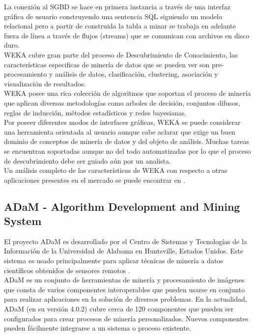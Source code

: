 La conexi\'on al SGBD se hace en primera instancia a trav\'es de una interfaz gr\'afica de usuario construyendo
una sentencia SQL siguiendo un modelo relacional pero a partir de construida la tabla a minar se trabaja en
adelante fuera de l\'inea a trav\'es de flujos (streams) que se comunican con archivos en disco duro.\\

WEKA cubre gran parte del proceso de Descubrimiento de Conocimiento, las caracter\'isticas especificas de
miner\'ia de datos que se pueden ver son pre-procesamiento y an\'alisis de datos, clasificaci\'on, clustering,
asociaci\'on y visualizaci\'on de resultados.\\

WEKA posee una rica colecci\'on de algoritmos que soportan el proceso de miner\'ia que aplican diversas
metodolog\'ias como arboles de decisi\'on, conjuntos difusos, reglas de inducci\'on, m\'etodos estad\'isticos y
redes bayesianas.\\

Por poseer diferentes modos de interfaces gr\'aficas, WEKA se puede considerar una herramienta orientada al
usuario aunque cabe aclarar que exige un buen dominio de conceptos de miner\'ia de datos y del objeto de
an\'alisis.  Muchas tareas se encuentran soportadas aunque no del todo automatizadas por lo que el proceso de
descubrimiento debe ser guiado a\'un por un analista.\\

Un an\'alisis completo de las caracter\'isticas de WEKA con respecto a otras aplicaciones presentes en el mercado
se puede encontrar en \cite{10}.

\subsection{ADaM - Algorithm Development and Mining System}
El proyecto ADaM es desarrollado por el Centro de Sistemas y Tecnolog\'ias de la Informaci\'on de la Universidad
de Alabama en Huntsville, Estados Unidos.  Este sistema es usado principalmente para aplicar t\'ecnicas de
miner\'ia a datos cient\'ificos obtenidos de sensores remotos \cite{adam}.\\

ADaM es un conjunto de herramientas de miner\'ia y procesamiento de im\'agenes que consta de varios componentes
interoperables que pueden u\-sarse en conjunto para realizar aplicaciones en la soluci\'on de diversos
pro\-blemas. En la actualidad, ADaM (en su versi\'on 4.0.2) cubre cerca de 120 componentes \cite{adamComp} que
pueden ser configurados para crear procesos de mine\-r\'ia personalizados.  Nuevos componentes pueden f\'acilmente
integrarse a un sistema o proceso existente.\\

